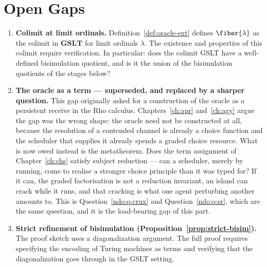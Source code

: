 \chapter{Open Gaps}
\label{sec:hyper-gaps}

\begin{enumerate}[label=\textbf{Gap \arabic*.}, leftmargin=*, itemsep=8pt]

  \item \textbf{Colimit at limit ordinals.}
        Definition~\ref{def:oracle-ext} defines $\fiber{\lambda}$
        as the colimit in $\mathbf{GSLT}$ for limit ordinals
        $\lambda$.
        The existence and properties of this colimit require
        verification.
        In particular: does the colimit GSLT have a well-defined
        bisimulation quotient, and is it the union of the bisimulation
        quotients of the stages below?

  \item \textbf{The oracle as a term --- superseded, and replaced
        by a sharper question.}
        This gap originally asked for a construction of the oracle
        as a persistent receive in the Rho calculus.
        Chapters~\ref{ch:apr} and~\ref{ch:agy} argue the gap was
        the wrong shape: the oracle need not be constructed at all,
        because the resolution of a contended channel is already a
        choice function and the scheduler that supplies it already
        spends a graded choice resource.
        What is now owed instead is the metatheorem.
        Does the term assignment of Chapter~\ref{ch:chs} satisfy
        subject reduction --- can a scheduler, merely by running,
        come to realise a stronger choice principle than it was
        typed for?
        If it can, the graded factorisation is not a reduction
        invariant, an island can crack while it runs, and that
        cracking is what one agent perturbing another amounts to.
        This is Question~\ref{ndo:q:crux} and
        Question~\ref{ndo:q:sr}, which are the same question, and
        it is the load-bearing gap of this part.

  \item \textbf{Strict refinement of bisimulation
        (Proposition~\ref{prop:strict-bisim}).}
        The proof sketch uses a diagonalization argument.
        The full proof requires specifying the encoding of Turing
        machines as terms and verifying that the diagonalization
        goes through in the GSLT setting.


\end{enumerate}
